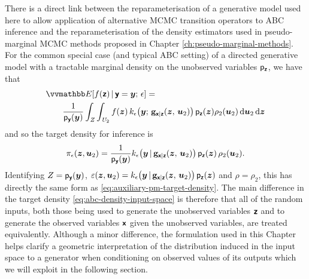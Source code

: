 There is a direct link between the reparameterisation of a generative model used here to allow application of alternative \ac{MCMC} transition operators to \ac{ABC} inference and the reparameterisation of the density estimators used in pseudo-marginal \ac{MCMC} methods proposed in Chapter \ref{ch:pseudo-marginal-methods}. For the common special case (and typical \ac{ABC} setting) of a directed generative model with a tractable marginal density on the unobserved variables $\mathsf{p}_{\boldsymbol{\mathsf{z}}}$, we have that
\begin{align}\label{eq:abc-expectation-input-space-directed}
  &\expc{f(\rvct{z}) \gvn \rvct{y}=\vct{y};\,\epsilon} = \\ \nonumber
  &\qquad
  \frac{1}{\pden{\rvct{y}}(\vct{y})}
  \int_\set{Z}\int_{\set{U}_2} 
    f(\vct{z}) \,
    k_\epsilon{\lpa\vct{y};\,\genfunc_{\rvct{x}|\rvct{z}}(\vct{z},\,\vct{u}_2)\rpa}\,
    \pden{\rvct{z}}(\vct{z})
    \rho_2(\vct{u}_2)
  \,\dr\vct{u}_2\,\dr\vct{z}
\end{align}
and so the target density for inference is
\begin{equation}\label{eq:abc-density-input-space-directed}
  \pi_\epsilon(\vct{z},\vct{u}_2) = \frac{1}{\pden{\rvct{y}}(\vct{y})} 
  k_\epsilon{\lpa\vct{y}\gvn\genfunc_{\rvct{x}|\rvct{z}}(\vct{z},\,\vct{u}_2)\rpa}\,\pden{\rvct{z}}(\vct{z})\,\rho_2(\vct{u}_2).
\end{equation}
Identifying $Z = \mathsf{p}_{\boldsymbol{\mathsf{y}}}(\boldsymbol{y})$, $\esttgtdens(\vct{z}, \vct{u}_2) = k_\epsilon{\lpa\vct{y}\gvn\genfunc_{\rvct{x}|\rvct{z}}(\vct{z},\,\vct{u}_2)\rpa}\,\pden{\rvct{z}}(\vct{z})$ and $\rho = \rho_2$, this has directly the same form as \eqref{eq:auxiliary-pm-target-density}. The main difference in the target density \eqref{eq:abc-density-input-space} is therefore that all of the random inputs, both those being used to generate the unobserved variables $\boldsymbol{\mathsf{z}}$ and to generate the observed variables $\boldsymbol{\mathsf{x}}$ given the unobserved variables, are treated equivalently. Although a minor difference, the formulation used in this Chapter helps clarify a geometric interpretation of the distribution induced in the input space to a generator when conditioning on observed values of its outputs which we will exploit in the following section.

